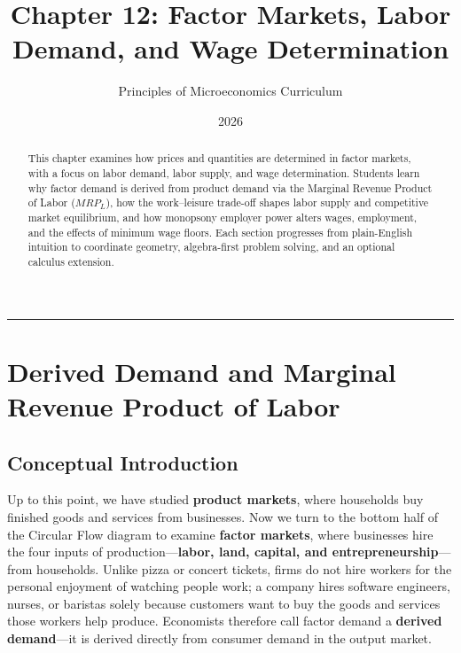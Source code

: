 \documentclass[11pt,letterpaper]{article}
\begin{document}
\title{\Huge\bfseries\color{SlateBlue} Chapter 12: Factor Markets, Labor Demand, and Wage Determination}
\author{\large Principles of Microeconomics Curriculum}
\date{2026}
\maketitle

\thispagestyle{plain}

\begin{abstract}
This chapter examines how prices and quantities are determined in factor markets, with a focus on labor demand, labor supply, and wage determination. Students learn why factor demand is derived from product demand via the Marginal Revenue Product of Labor ($MRP_L$), how the work--leisure trade-off shapes labor supply and competitive market equilibrium, and how monopsony employer power alters wages, employment, and the effects of minimum wage floors. Each section progresses from plain-English intuition to coordinate geometry, algebra-first problem solving, and an optional calculus extension.
\end{abstract}

\tableofcontents
\vspace{1.5em}
\hrule
\vspace{1.5em}

\section{Derived Demand and Marginal Revenue Product of Labor}

\subsection*{Conceptual Introduction}
Up to this point, we have studied \textbf{product markets}, where households buy finished goods and services from businesses. Now we turn to the bottom half of the Circular Flow diagram to examine \textbf{factor markets}, where businesses hire the four inputs of production---\textbf{labor, land, capital, and entrepreneurship}---from households. Unlike pizza or concert tickets, firms do not hire workers for the personal enjoyment of watching people work; a company hires software engineers, nurses, or baristas solely because customers want to buy the goods and services those workers help produce. Economists therefore call factor demand a \textbf{derived demand}---it is derived directly from consumer demand in the output market.
\end{document}
